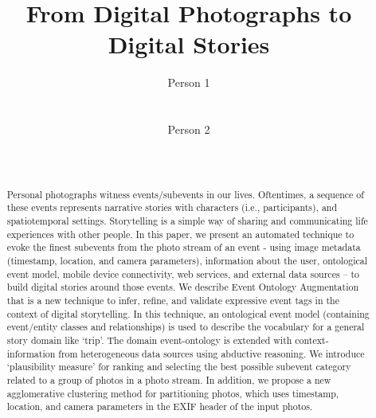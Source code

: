\documentclass{sig-alternate}
\begin{document}
\title{From Digital Photographs to Digital Stories}

\author{
\alignauthor
Person 1\\
       \\
       \\
\alignauthor
Person 2\\
       \\
       \\
}


\maketitle
\begin{abstract}
Personal photographs witness events/subevents in our lives. Oftentimes, a sequence of these events represents narrative stories with characters (i.e., participants), and spatiotemporal settings. Storytelling is a simple way of sharing and communicating life experiences with other people. In this paper, we present an automated technique to evoke the finest subevents from the photo stream of an event - using image metadata (timestamp, location, and camera parameters), information about the user, ontological event model, mobile device connectivity, web services, and external data sources – to build digital stories around those events. We describe Event Ontology Augmentation that is a new technique to infer, refine, and validate expressive event tags in the context of digital storytelling. In this technique, an ontological event model (containing event/entity classes and relationships) is used to describe the vocabulary for a general story domain like ‘trip’. The domain event-ontology is extended with context-information from heterogeneous data sources using abductive reasoning. We introduce ‘plausibility measure’ for ranking and selecting the best possible subevent category related to a group of photos in a photo stream. In addition, we propose a new agglomerative clustering method for partitioning photos, which uses timestamp, location, and camera parameters in the EXIF header of the input photos. 
\end{abstract}


\end{document}
